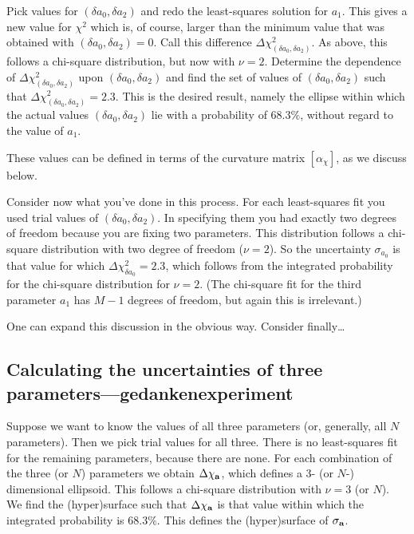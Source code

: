 \documentclass[psfig,preprint]{aastex}
\begin{document}
	Pick values for $(\delta a_0, \delta a_2)$ and redo the
least-squares solution for $a_1$.  This gives a new value for $\chi^2$
which is, of course, larger than the minimum value that was obtained
with $(\delta a_0,\delta a_2)=0$.  Call this difference $\Delta
\chi_{(\delta a_0,\delta a_2)}^2$.  As above, this follows a chi-square
distribution, but now with $\nu = 2$. Determine the dependence of
$\Delta \chi_{(\delta a_0,\delta a_2)}^2$ upon $(\delta a_0, \delta
a_2)$ and find the set of values of $(\delta a_0, \delta a_2)$ such that
$\Delta \chi_{(\delta a_0, \delta a_2)}^2 = 2.3$.  This is the desired
result, namely the ellipse within which the actual values $(\delta a_0,
\delta a_2)$ lie with a probability of $68.3\%$, without regard to the
value of $a_1$. 

	These values can be defined in terms of the curvature matrix
$[\alpha_\chi]$, as we discuss below.  

	Consider now what you've done in this process.  For each
least-squares fit you used trial values of $(\delta a_0,\delta a_2)$. 
In specifying them you had exactly two degrees of freedom because you
are fixing two parameters.  This distribution follows a chi-square
distribution with two degree of freedom ($\nu = 2$).  So the uncertainty
$\sigma_{a_0}$ is that value for which $\Delta \chi_{\delta a_0}^2 =
2.3$, which follows from the integrated probability for the chi-square
distribution for $\nu=2$.  (The chi-square fit for the third parameter
$a_1$ has $M-1$ degrees of freedom, but again this is irrelevant.)

	One can expand this discussion in the obvious way. Consider
finally\dots

\subsection{ Calculating the uncertainties of three
parameters---gedankenexperiment} \label{gencalc2} 

	Suppose we want to know the values of all three parameters (or,
generally, all $N$ parameters).  Then we pick trial values for all
three.  There is no least-squares fit for the remaining parameters,
because there are none.  For each combination of the three (or $N$)
parameters we obtain $\Delta \chi_{\bf a}$, which defines a 3- (or $N$-)
dimensional ellipsoid.  This follows a chi-square distribution with
$\nu = 3$ (or $N$).  We find the (hyper)surface such that $\Delta
\chi_{\bf a}$ is that value within which the integrated probability is
$68.3\%$.  This defines the (hyper)surface of $\sigma_{\bf a}$. 
\end{document}
